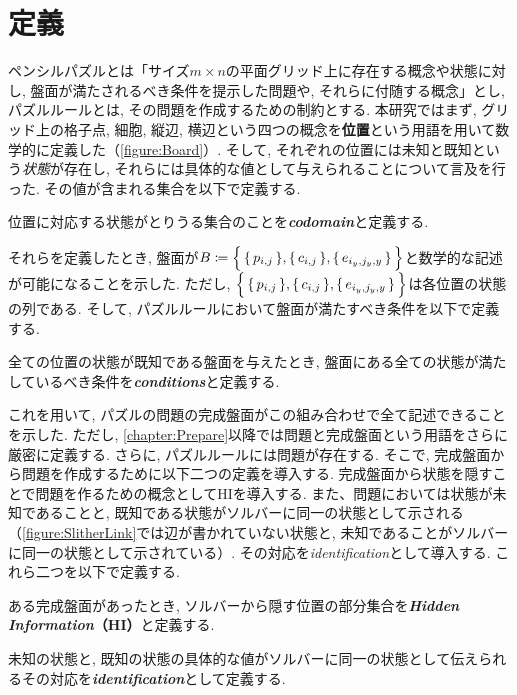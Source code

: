 \section{定義}\label{section:IntroDefinition}
ペンシルパズルとは「サイズ$m\times n$の平面グリッド上に存在する概念や状態に対し, 盤面が満たされるべき条件を提示した問題や, それらに付随する概念」とし, パズルルールとは, その問題を作成するための制約とする. 本研究ではまず, グリッド上の格子点, 細胞, 縦辺, 横辺という四つの概念を\textbf{位置}という用語を用いて数学的に定義した（\cref{figure:Board}）. そして, それぞれの位置には未知と既知という\textit{状態}が存在し, それらには具体的な値として与えられることについて言及を行った. その値が含まれる集合を以下で定義する.
\begin{definition}
  位置に対応する状態がとりうる集合のことを\textbf{\textit{codomain}}と定義する.
\end{definition}
それらを定義したとき, 盤面が$B\coloneqq\Bigl\{\,\{\,p_{i,j}\,\},\{\,c_{i,j}\,\},\{\,e_{i_y,j_y,y}\,\}\,\Bigr\}$と数学的な記述が可能になることを示した. ただし, $\Bigl\{\,\{\,p_{i,j}\,\},\{\,c_{i,j}\,\},\{\,e_{i_y,j_y,y}\,\}\,\Bigr\}$は各位置の状態の列である. そして, パズルルールにおいて盤面が満たすべき条件を以下で定義する.
\begin{definition}
  全ての位置の状態が既知である盤面を与えたとき, 盤面にある全ての状態が満たしているべき条件を\textbf{\textit{conditions}}と定義する.
\end{definition}
これを用いて, パズルの問題の完成盤面がこの組み合わせで全て記述できることを示した. ただし, \cref{chapter:Prepare}以降では問題と完成盤面という用語をさらに厳密に定義する. さらに, パズルルールには問題が存在する. そこで, 完成盤面から問題を作成するために以下二つの定義を導入する. 完成盤面から状態を隠すことで問題を作るための概念としてHIを導入する. また、問題においては状態が未知であることと, 既知である状態がソルバーに同一の状態として示される（\cref{figure:SlitherLink}では辺が書かれていない状態と, 未知であることがソルバーに同一の状態として示されている）. その対応を\textit{identification}として導入する. これら二つを以下で定義する.
\begin{definition}
  ある完成盤面があったとき, ソルバーから隠す位置の部分集合を\textbf{\textit{Hidden Information}（HI）}と定義する.
\end{definition}
\begin{definition}
  未知の状態と, 既知の状態の具体的な値がソルバーに同一の状態として伝えられるその対応を\textbf{\textit{identification}}として定義する.
\end{definition}


